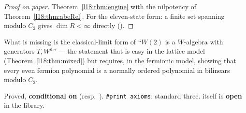 \begin{proof}[Proof on paper]
Theorem~\ref{l18:thm:engine} with the nilpotency of Theorem~\ref{l18:thm:abeRel}. For the eleven-state form:
a finite set spanning modulo $C_2$ gives $\dim R<\infty$ directly ().
\end{proof}
\begin{physics}
What is missing is the classical-limit form of ``$W(2)$ is a $W$-algebra with generators $T,W^a$'' --- the
statement that is easy in the lattice model (Theorem~\ref{l18:thm:mixed}) but requires, in the fermionic model,
showing that every even fermion polynomial is a normally ordered polynomial in bilinears modulo $C_2$.
\end{physics}
\begin{status}
Proved, \textbf{conditional on}  (resp.\ ).
\texttt{\#print axioms}: standard three.  itself is \textbf{open} in the library.
\end{status}

